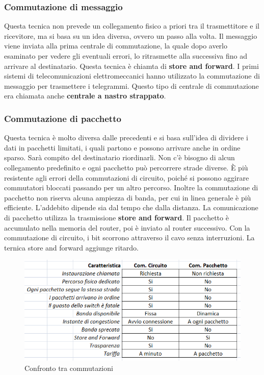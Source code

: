 \subsubsection*{Commutazione di messaggio}

Questa tecnica non prevede un collegamento fisico a priori tra il trasmettitore e il ricevitore, ma si basa su un idea diversa, ovvero un passo alla volta. Il messaggio viene inviata alla prima centrale di commutazione, la quale dopo averlo esaminato per vedere gli eventuali errori, lo ritrasmette alla successiva fino ad arrivare al destinatario. Questa tecnica è chiamta di \textbf{store and forward}. I primi sistemi di telecomunicazioni elettromeccanici hanno utilizzato la commutazione di messaggio per trasmettere i telegrammi. Questo tipo di centrale di commutazione era chiamata anche \textbf{centrale a nastro strappato}.

\subsubsection*{Commutazione di pacchetto}

Questa tecnica è molto diversa dalle precedenti e si basa sull'idea di dividere i dati in pacchetti limitati, i quali partono e possono arrivare anche in ordine sparso. Sarà compito del destinatario riordinarli. Non c'è bisogno di alcun collegamento predefinito e ogni pacchetto può percorrere strade diverse. È più resistente agli errori della commutazioni di circuito, poiché si possono aggirare commutatori bloccati passando per un altro percorso. Inoltre la commutazione di pacchetto non riserva alcuna ampiezza di banda, per cui in linea generale è più efficiente. L'addebito dipende sia dal tempo che dalla distanza.
La comunicazione di pacchetto utilizza la trasmissione \textbf{store and forward}. Il pacchetto è accumulato nella memoria del router, poi è inviato al router successivo. Con la commutazione di circuito, i bit scorrono attraverso il cavo senza interruzioni. La ternica store and forward aggiunge ritardo.

\begin{figure}[htbp]
\centering
\includegraphics[scale=0.8]{images/comm.png}
\caption{Confronto tra commutazioni}
\end{figure}

